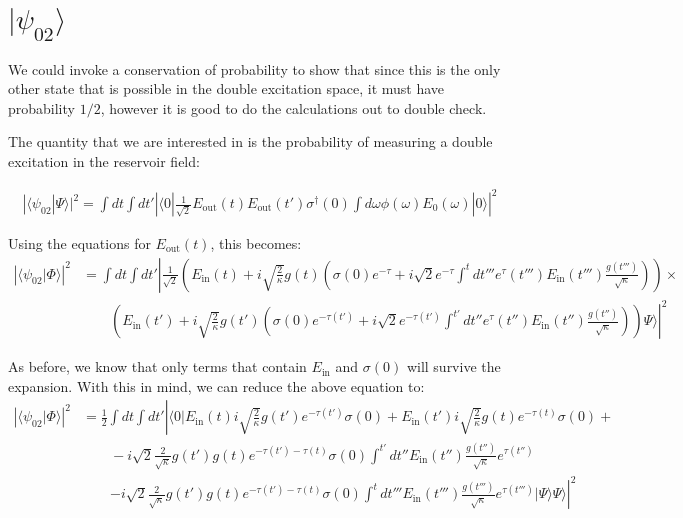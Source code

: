\documentclass[12pt]{article}
\begin{document}
\section{$| \psi_{02} \rangle $}

We could invoke a conservation of probability to show that since this is the only other state that is possible in the double excitation space, it must have probability $1/2$, however it is good to do the calculations out to double check.

The quantity that we are interested in is the probability of measuring a double excitation in the reservoir field:

\begin{align}
|\langle \psi_{02} | \Psi \rangle |^2 =\int dt \int dt' \left | \langle 0 |\frac{1}{\sqrt{2}} E_\textrm{out}(t) E_\textrm{out}(t') \sigma^\dagger(0) \int d \omega \phi(\omega) E_0(\omega) | 0 \rangle \right |^2
\end{align}

Using the equations for $E_\textrm{out}(t)$, this becomes:
\begin{align}
\left | \langle \psi_{02} | \Phi \rangle \right | ^2 & =\int dt \int dt'\left |  \frac{1}{\sqrt{2}}\left ( E_\textrm{in}(t) 
+ i \sqrt{\frac{2}{\kappa}} g(t)\left ( \sigma(0) e^{-\tau} +
i\sqrt{2} e^{-\tau} \int^t d t''' e^\tau(t''') E_\textrm{in}(t''') \frac{g(t''')}{\sqrt{\kappa}} \right ) \right) \right .\times \\
 &\qquad \left. \left (E_\textrm{in}(t') + i \sqrt{\frac{2}{\kappa}} g(t')\left( \sigma(0) e^{-\tau(t')} +
 i\sqrt{2} e^{-\tau(t')} \int^{t'} d t'' e^\tau(t'') E_\textrm{in}(t'') \frac{g(t'')}{\sqrt{\kappa}}\right ) \right )  \Psi \rangle \right |^2
\end{align}

 
 As before, we know that only terms that contain $E_\textrm{in}$ and $\sigma(0)$ will survive the expansion. With this in 
 mind, we can reduce the above equation to:
\begin{align}
 \left | \langle \psi_{02} | \Phi \rangle \right | ^2 & = \frac{1}{2}\int dt \int dt'\left |\langle 0 | E_\textrm{in}(t) i \sqrt{\frac{2}{\kappa}} g(t') e^{-\tau(t')}\sigma(0) + E_\textrm{in}(t') i \sqrt{\frac{2}{\kappa}} g(t) e^{-\tau(t)}\sigma(0) +\right.\\
&\qquad -i\sqrt{2}\frac{2}{\sqrt{\kappa}}g(t')g(t) e^{-\tau(t')-\tau(t)}\sigma(0) \int ^{t'} dt'' E_\textrm{in}(t'')\frac{g(t'')}{\sqrt{\kappa}} e^{\tau(t'')}\\
&\qquad \left. -i\sqrt{2}\frac{2}{\sqrt{\kappa}}g(t')g(t) e^{-\tau(t')-\tau(t)}\sigma(0) \int ^t dt''' E_\textrm{in}(t''')\frac{g(t''')}{\sqrt{\kappa}} e^{\tau(t''')}| \Psi \rangle \Psi \rangle\right |^2
 \end{align}
 
\end{document}
